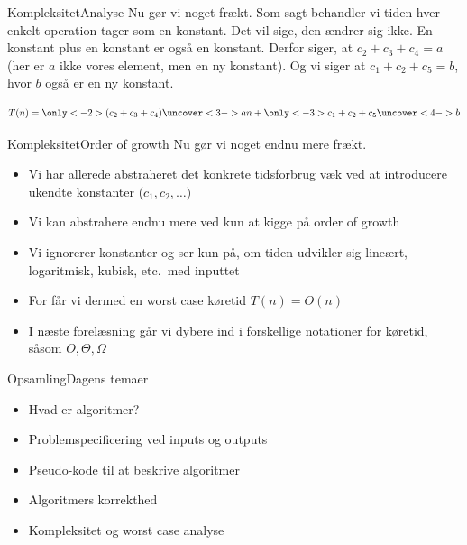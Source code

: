 \documentclass[aspectratio=1610]{beamer}
\begin{document}
\begin{frame}{Kompleksitet}{Analyse}
    Nu gør vi noget frækt. \pause Som sagt behandler vi tiden hver enkelt
    operation tager som en konstant. Det vil sige, den ændrer sig ikke. En
    konstant plus en konstant er også en konstant. Derfor siger, at $c_2 + c_3 +
    c_4 = a$ (her er $a$ ikke vores element, men en ny konstant). Og vi siger at
    $c_1 + c_2 + c_5 = b$, hvor $b$ også er en ny konstant.

    \begin{equation*}
        T(n) = \only<-2>{(c_2 + c_3 + c_4)}\uncover<3->{a}n + \only<-3>{c_1 + c_2
        + c_5}\uncover<4->{b}
    \end{equation*}

\end{frame}

\begin{frame}{Kompleksitet}{Order of growth}
    Nu gør vi noget endnu mere frækt. \pause

    \begin{itemize}
        \item Vi har allerede abstraheret det konkrete tidsforbrug væk ved at
            introducere ukendte konstanter ($c_1, c_2, \ldots)$
            \pause
        \item Vi kan abstrahere endnu mere ved kun at kigge på \alert{order of
            growth}
            \pause
        \item Vi \alert{ignorerer konstanter} og ser kun på, om tiden udvikler
            sig \alert{lineært}, \alert{logaritmisk}, \alert{kubisk}, etc.\ med
            inputtet
            \pause
        \item For  får vi dermed en worst case køretid
            \alert{$T(n) = O(n)$}
            \pause
        \item I næste forelæsning går vi dybere ind i forskellige notationer for
            køretid, såsom $O, \Theta, \Omega$
    \end{itemize}
    
\end{frame}

\begin{frame}{Opsamling}{Dagens temaer}
    \begin{itemize}
        \item Hvad er algoritmer? 
        \item Problemspecificering ved inputs og outputs
        \item Pseudo-kode til at beskrive algoritmer
        \item Algoritmers korrekthed
        \item Kompleksitet og worst case analyse
    \end{itemize}
\end{frame}
\end{document}
